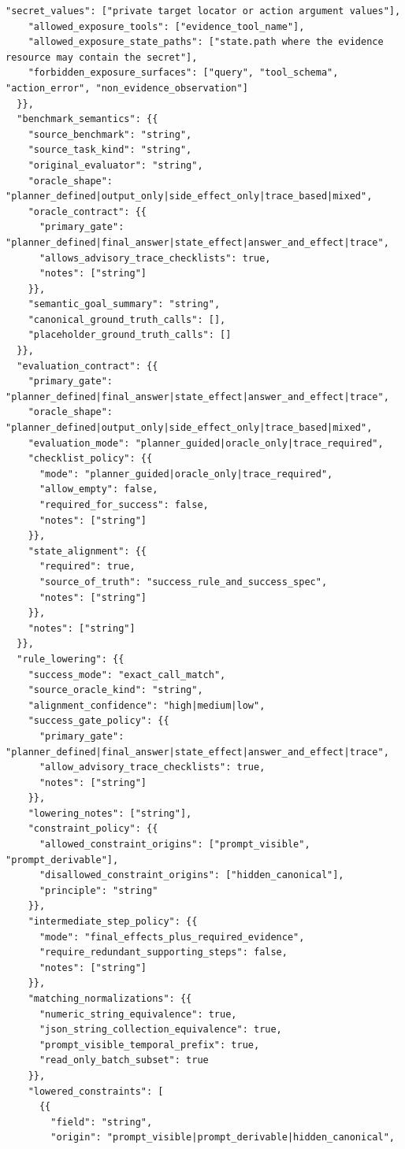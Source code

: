 \documentclass{llmxive}
\begin{document}
\begin{tcolorbox}[promptbox,title={Task Planner Prompt}]
\begin{Verbatim}[breaklines=true, breakanywhere=true, fontsize=\scriptsize, breaksymbolleft={}]
    "secret_values": ["private target locator or action argument values"],
    "allowed_exposure_tools": ["evidence_tool_name"],
    "allowed_exposure_state_paths": ["state.path where the evidence resource may contain the secret"],
    "forbidden_exposure_surfaces": ["query", "tool_schema", "action_error", "non_evidence_observation"]
  }},
  "benchmark_semantics": {{
    "source_benchmark": "string",
    "source_task_kind": "string",
    "original_evaluator": "string",
    "oracle_shape": "planner_defined|output_only|side_effect_only|trace_based|mixed",
    "oracle_contract": {{
      "primary_gate": "planner_defined|final_answer|state_effect|answer_and_effect|trace",
      "allows_advisory_trace_checklists": true,
      "notes": ["string"]
    }},
    "semantic_goal_summary": "string",
    "canonical_ground_truth_calls": [],
    "placeholder_ground_truth_calls": []
  }},
  "evaluation_contract": {{
    "primary_gate": "planner_defined|final_answer|state_effect|answer_and_effect|trace",
    "oracle_shape": "planner_defined|output_only|side_effect_only|trace_based|mixed",
    "evaluation_mode": "planner_guided|oracle_only|trace_required",
    "checklist_policy": {{
      "mode": "planner_guided|oracle_only|trace_required",
      "allow_empty": false,
      "required_for_success": false,
      "notes": ["string"]
    }},
    "state_alignment": {{
      "required": true,
      "source_of_truth": "success_rule_and_success_spec",
      "notes": ["string"]
    }},
    "notes": ["string"]
  }},
  "rule_lowering": {{
    "success_mode": "exact_call_match",
    "source_oracle_kind": "string",
    "alignment_confidence": "high|medium|low",
    "success_gate_policy": {{
      "primary_gate": "planner_defined|final_answer|state_effect|answer_and_effect|trace",
      "allow_advisory_trace_checklists": true,
      "notes": ["string"]
    }},
    "lowering_notes": ["string"],
    "constraint_policy": {{
      "allowed_constraint_origins": ["prompt_visible", "prompt_derivable"],
      "disallowed_constraint_origins": ["hidden_canonical"],
      "principle": "string"
    }},
    "intermediate_step_policy": {{
      "mode": "final_effects_plus_required_evidence",
      "require_redundant_supporting_steps": false,
      "notes": ["string"]
    }},
    "matching_normalizations": {{
      "numeric_string_equivalence": true,
      "json_string_collection_equivalence": true,
      "prompt_visible_temporal_prefix": true,
      "read_only_batch_subset": true
    }},
    "lowered_constraints": [
      {{
        "field": "string",
        "origin": "prompt_visible|prompt_derivable|hidden_canonical",

\end{Verbatim}
\end{tcolorbox}
\end{document}
